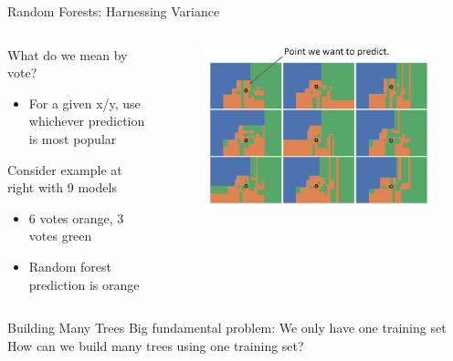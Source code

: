 \documentclass[aspectratio=169]{../latex_main/tntbeamer}  %
\begin{document}
	
	\begin{frame}[c]{Random Forests: Harnessing Variance}
	    \begin{columns}
	        \begin{column}{.5\textwidth}
	                What do we mean by vote?
	                \begin{itemize}
	                    \item For a given x/y, use whichever prediction is most popular
	                \end{itemize}
	                
	                Consider example at right with 9 models
	                \begin{itemize}
	                    \item 6 votes orange, 3 votes green 
	                    \item Random forest prediction is orange
	                \end{itemize}
	        \end{column}
	        
	        \begin{column}{.5\textwidth}
	                \begin{figure}
	                    \centering
	                    \includegraphics[scale=.35]{Bild56}
	                \end{figure}
	        \end{column}
	    \end{columns}
	\end{frame}
	
	\begin{frame}[c]{Building Many Trees}
	    Big fundamental problem: We only have one training set\\
	    \bigskip
	    How can we build many trees using one training set?

	\end{frame}
	
\end{document}
